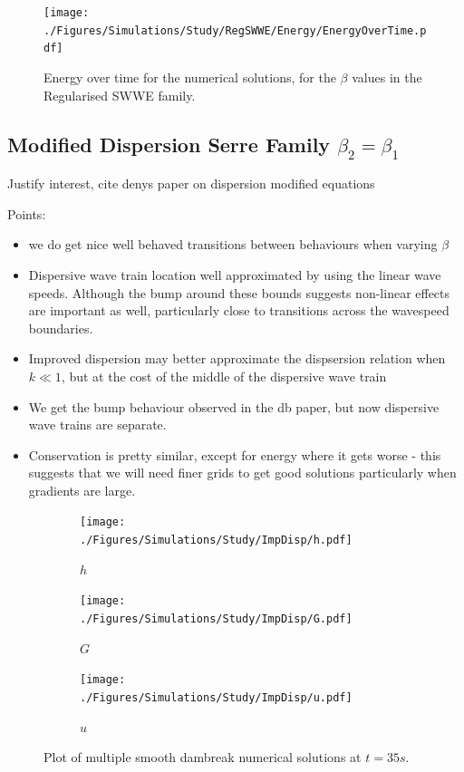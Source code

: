 \documentclass[10pt]{article}
\begin{document}
\begin{figure}
	\centering
	\texttt{[image: ./Figures/Simulations/Study/RegSWWE/Energy/EnergyOverTime.pdf]}
	\caption{Energy over time for the numerical solutions, for the $\beta$ values in the Regularised SWWE family.}
\end{figure}


\subsection{Modified Dispersion Serre Family $\beta_2 = \beta_1$}
Justify interest, cite denys paper on dispersion modified equations

Points:
\begin{itemize}
	\item we do get nice well behaved transitions between behaviours when varying $\beta$
	\item Dispersive wave train location well approximated by using the linear wave speeds. Although the bump around these bounds suggests non-linear effects are important as well, particularly close to transitions across the wavespeed boundaries. 
	\item Improved dispersion may better approximate the dispsersion relation when $k\ll 1$, but at the cost of the middle of the dispersive wave train
	\item We get the bump behaviour observed in the db paper, but now dispersive wave trains are separate.
	\item Conservation is pretty similar, except for energy where it gets worse - this suggests that we will need finer grids to get good solutions particularly when gradients are large.
\end{itemize}

\begin{figure}
	\centering
	\begin{subfigure}{0.322\textwidth}
		\centering
		\texttt{[image: ./Figures/Simulations/Study/ImpDisp/h.pdf]}
		\caption{$h$}
	\end{subfigure}
	\begin{subfigure}{0.32\textwidth}
		\centering
		\texttt{[image: ./Figures/Simulations/Study/ImpDisp/G.pdf]}
		\caption{$G$}
	\end{subfigure}
	\begin{subfigure}{0.32\textwidth}
	\centering
	\texttt{[image: ./Figures/Simulations/Study/ImpDisp/u.pdf]}
	\caption{$u$}
	\end{subfigure}
	\caption{Plot of multiple smooth dambreak numerical solutions at $t=35s$.}
\end{figure}
\end{document}
